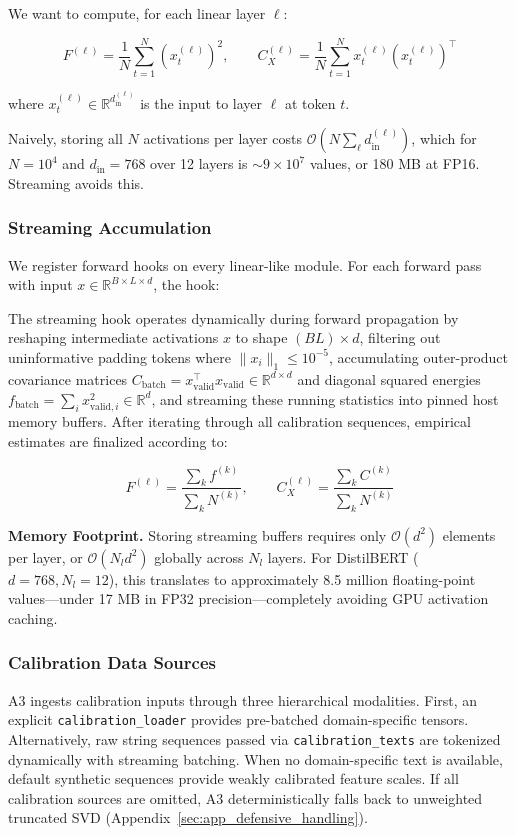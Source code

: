 We want to compute, for each linear layer $\ell$:

\[
F^{(\ell)} = \frac{1}{N} \sum_{t=1}^{N} \left(x_t^{(\ell)}\right)^2, \qquad
C_X^{(\ell)} = \frac{1}{N} \sum_{t=1}^{N} x_t^{(\ell)} \left(x_t^{(\ell)}\right)^\top
\tag{4.1}
\]

where $x_t^{(\ell)} \in \mathbb{R}^{d_\text{in}^{(\ell)}}$ is the input to 
layer $\ell$ at token $t$.

Naively, storing all $N$ activations per layer costs $\mathcal{O}(N \sum_\ell d_\text{in}^{(\ell)})$, 
which for $N = 10^4$ and $d_\text{in} = 768$ over 12 layers is $\sim 9 \times 10^7$ 
values, or 180 MB at FP16. Streaming avoids this.

\subsubsection{Streaming Accumulation}

We register forward hooks on every linear-like module. For each forward pass 
with input $x \in \mathbb{R}^{B \times L \times d}$, the hook:

The streaming hook operates dynamically during forward propagation by reshaping intermediate activations $x$ to shape $(B L) \times d$, filtering out uninformative padding tokens where $\|x_i\|_1 \le 10^{-5}$, accumulating outer-product covariance matrices $C_\text{batch} = x_\text{valid}^\top x_\text{valid} \in \mathbb{R}^{d \times d}$ and diagonal squared energies $f_\text{batch} = \sum_i x_{\text{valid}, i}^2 \in \mathbb{R}^d$, and streaming these running statistics into pinned host memory buffers. After iterating through all calibration sequences, empirical estimates are finalized according to:

\[
F^{(\ell)} = \frac{\sum_k f^{(k)}}{\sum_k N^{(k)}}, \qquad
C_X^{(\ell)} = \frac{\sum_k C^{(k)}}{\sum_k N^{(k)}}
\tag{4.2}
\]

\textbf{Memory Footprint.} Storing streaming buffers requires only $\mathcal{O}(d^2)$ elements per layer, or $\mathcal{O}(N_l d^2)$ globally across $N_l$ layers. For DistilBERT ($d = 768, N_l = 12$), this translates to approximately 8.5 million floating-point values—under 17 MB in FP32 precision—completely avoiding GPU activation caching.

\subsubsection{Calibration Data Sources}

A3 ingests calibration inputs through three hierarchical modalities. First, an explicit \texttt{calibration\_loader} provides pre-batched domain-specific tensors. Alternatively, raw string sequences passed via \texttt{calibration\_texts} are tokenized dynamically with streaming batching. When no domain-specific text is available, default synthetic sequences provide weakly calibrated feature scales. If all calibration sources are omitted, A3 deterministically falls back to unweighted truncated SVD (Appendix~\ref{sec:app_defensive_handling}).

